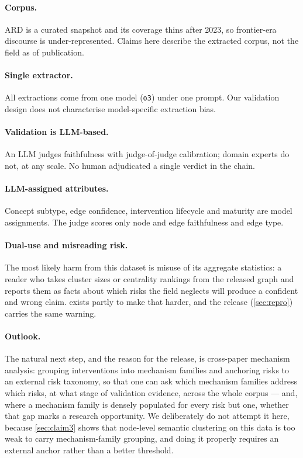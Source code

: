 \documentclass[10pt,twocolumn,letterpaper]{article}
\begin{document}
\paragraph{Corpus.} ARD is a curated snapshot and its coverage thins after 2023,
so frontier-era discourse is under-represented. Claims here describe the extracted
corpus, not the field as of publication.

\paragraph{Single extractor.} All extractions come from one model (\texttt{o3})
under one prompt. Our validation design does not characterise model-specific
extraction bias.

\paragraph{Validation is LLM-based.} An LLM judges faithfulness with
judge-of-judge calibration; domain experts do not, at any scale. No human
adjudicated a single verdict in the chain.

\paragraph{LLM-assigned attributes.} Concept subtype, edge confidence,
intervention lifecycle and maturity are model assignments. The judge scores only
node and edge faithfulness and edge type.

\paragraph{Dual-use and misreading risk.} The most likely harm from this dataset
is misuse of its aggregate statistics: a reader who takes cluster sizes or
centrality rankings from the released graph and reports them as facts about which
risks the field neglects will produce a confident and wrong claim.
 exists partly to make that harder, and the release
(\cref{sec:repro}) carries the same warning.

\paragraph{Outlook.} The natural next step, and the reason for the release, is
cross-paper mechanism analysis: grouping interventions into mechanism families and
anchoring risks to an external risk taxonomy, so that one can ask which mechanism
families address which risks, at what stage of validation evidence, across the
whole corpus --- and, where a mechanism family is densely populated for every risk
but one, whether that gap marks a research opportunity. We deliberately do not
attempt it here, because \cref{sec:claim3} shows that node-level semantic
clustering on this data is too weak to carry mechanism-family grouping, and doing
it properly requires an external anchor rather than a better threshold.
\end{document}
